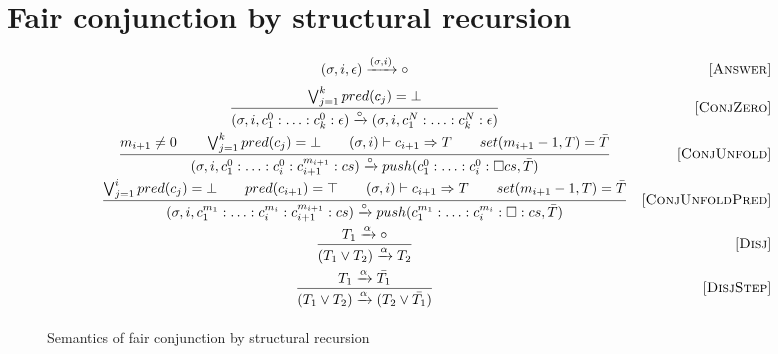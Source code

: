 \section{Fair conjunction by structural recursion}

\begin{figure}[h!]
\[\begin{array}{cr}

      {(\sigma, i, \epsilon) \xrightarrow{(\sigma, i)} \circ}  
&     \mbox{[\textsc{Answer}]} \\[2mm]
\dfrac{\bigvee_{j=1}^k pred(c_j) = \bot}
      {(\sigma, i, c_1^0 : \ldots : c_k^0 : \epsilon) \xrightarrow{\circ} (\sigma, i, c_1^N : \ldots : c_k^N : \epsilon)}
&     \mbox{[\textsc{ConjZero}]} \\[4mm]
\dfrac{m_{i+1} \not= 0 \qquad \bigvee_{j=1}^k pred(c_j) = \bot \qquad (\sigma, i) \vdash c_{i+1} \Rightarrow T \qquad set(m_{i+1} - 1, T) = \bar{T}}
      {(\sigma, i, c_1^0 : \ldots : c_i^0 : c_{i+1}^{m_{i+1}} : cs) \xrightarrow{\circ} push(c_1^0 : \ldots : c_i^0 : \Box cs, \bar{T})}
&     \mbox{[\textsc{ConjUnfold}]} \\[4mm]
\dfrac{\bigvee_{j=1}^i pred(c_j) = \bot \qquad pred(c_{i+1}) = \top \qquad (\sigma, i) \vdash c_{i+1} \Rightarrow T \qquad set(m_{i+1} - 1, T) = \bar{T}}
      {(\sigma, i, c_1^{m_1} : \ldots : c_i^{m_i} : c_{i+1}^{m_{i+1}} : cs) \xrightarrow{\circ} push(c_1^{m_1} : \ldots : c_i^{m_i} : \Box : cs, \bar{T})}
&     \mbox{[\textsc{ConjUnfoldPred}]} \\[4mm]
\dfrac{T_1 \xrightarrow{\alpha} \circ}
      {(T_1 \lor T_2) \xrightarrow{\alpha} T_2}
&     \mbox{[\textsc{Disj}]} \\[4mm]
\dfrac{T_1 \xrightarrow{\alpha} \bar{T_1}}
      {(T_1 \lor T_2) \xrightarrow{\alpha} (T_2 \lor\bar{T_1})}
&     \mbox{[\textsc{DisjStep}]} \\[4mm]
\end{array}\]
\caption{Semantics of fair conjunction by structural recursion}
\label{fair:structural-recursion-semantics}
\end{figure}

\FloatBarrier
